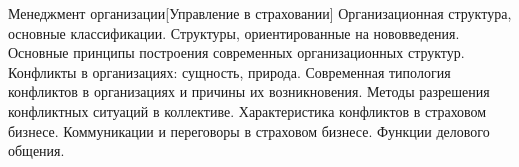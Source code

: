 \documentclass[
	11pt,
	a4paper,
	]
	{article}
\begin{document}
\begin{minipage}[t][\miniH]{\miniL}\centering
	 {Менеджмент организации}[Управление в страховании]
		{
			Организационная структура, основные классификации. Структуры, ориентированные на нововведения. Основные принципы построения современных организационных структур.
		}{
			Конфликты в организациях: сущность, природа. Современная типология конфликтов в организациях и причины их возникновения. Методы разрешения конфликтных ситуаций в коллективе. Характеристика конфликтов в страховом бизнесе.
		}{
			Коммуникации и переговоры в страховом бизнесе. Функции делового общения.
		}
	\lowGE
\end{minipage}

\vfill

	
\end{document}
